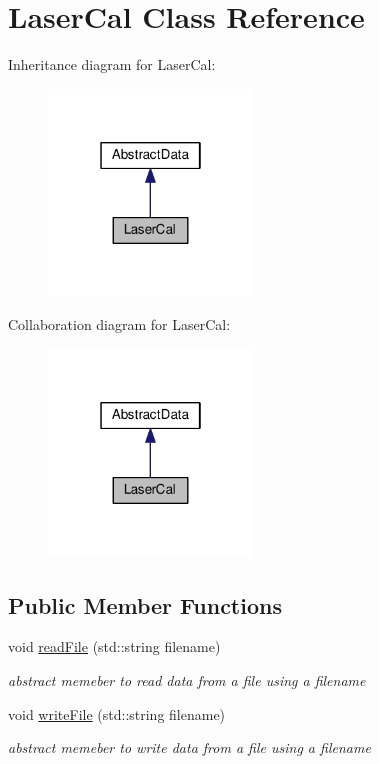 \hypertarget{classLaserCal}{}\section{Laser\+Cal Class Reference}
\label{classLaserCal}


Inheritance diagram for Laser\+Cal\+:\nopagebreak
\begin{figure}[H]
\begin{center}
\leavevmode
\includegraphics[width=154pt]{classLaserCal__inherit__graph}
\end{center}
\end{figure}


Collaboration diagram for Laser\+Cal\+:\nopagebreak
\begin{figure}[H]
\begin{center}
\leavevmode
\includegraphics[width=154pt]{classLaserCal__coll__graph}
\end{center}
\end{figure}
\subsection*{Public Member Functions}
\begin{DoxyCompactItemize}
\item 
void \hyperlink{classLaserCal_a8b046415d554ab9a0612a5f55f5e92ce}{read\+File} (std\+::string filename)
\begin{DoxyCompactList}\small\item\em abstract memeber to read data from a file using a filename \end{DoxyCompactList}\item 
void \hyperlink{classLaserCal_a08ba4fb6840a73989f75d2ec4aea3fcd}{write\+File} (std\+::string filename)
\begin{DoxyCompactList}\small\item\em abstract memeber to write data from a file using a filename \end{DoxyCompactList}\end{DoxyCompactItemize}

